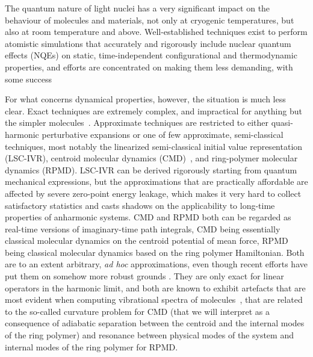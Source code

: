 \documentclass[aps,prb,superscriptaddress,amsmath,amssymb,showpacs,twocolumn]{revtex4}
\begin{document}
The quantum nature of light nuclei has a very significant impact on the behaviour
of molecules and materials, not only at cryogenic temperatures, but also at room 
temperature and above. 
Well-established techniques exist to perform atomistic simulations that accurately
and rigorously include nuclear quantum effects (NQEs) on static, time-independent
configurational and thermodynamic
properties\cite{feyn-hibb65book,chan-woly81jcp,parr-rahm84jcp,cepe95rmp},
and efforts are concentrated on making them less demanding, with some success \cite{ceri-mano12prl,  SUZUKI-CHIN/TUCKERMAN} 

For what concerns dynamical properties, however, the situation is much less clear.
Exact techniques are extremely complex, and impractical for anything but the simpler
molecules~\cite{????DAVID????}. Approximate techniques are restricted to either quasi-harmonic
perturbative expansions\cite{????} or one of few approximate, semi-classical 
techniques, most notably the linearized semi-classical initial value representation (LSC-IVR),
centroid molecular dynamics (CMD)~\cite{cao-voth93jcp,cao-voth94jcp}, and ring-polymer 
molecular dynamics (RPMD).
LSC-IVR can be derived rigorously starting from quantum mechanical expressions, but 
the approximations that are practically affordable are affected by severe
zero-point energy leakage, which makes it very hard to collect satisfactory statistics
and casts shadows on the applicability to long-time properties of anharmonic systems.
CMD and RPMD both can be regarded as real-time versions of imaginary-time path integrals,
CMD being essentially classical molecular dynamics on the centroid potential of mean force,
RPMD being classical molecular dynamics based on the ring polymer Hamiltonian. 
Both are to an extent arbitrary, \emph{ad hoc} approximations, even though recent 
efforts have put them on somehow more robust grounds \cite{rich-alth09jcp,hele-alth13jcp,jangvoth99jpc, jangvoth99jpc2, MORE?}.
They are only exact for linear operators in the harmonic limit\cite{habe+13arpc, jangvoth99jpc2}, and 
both are known to exhibit artefacts that are most evident when computing vibrational
spectra of molecules~\cite{witt+09jcp, ivanov+10jpc, habe+08jcp}, that are related to the so-called curvature problem for CMD
(that we will interpret as a consequence of adiabatic separation between the centroid
and the internal modes of the ring polymer) and resonance between physical modes
of the system and internal modes of the ring polymer for RPMD.
\end{document}

